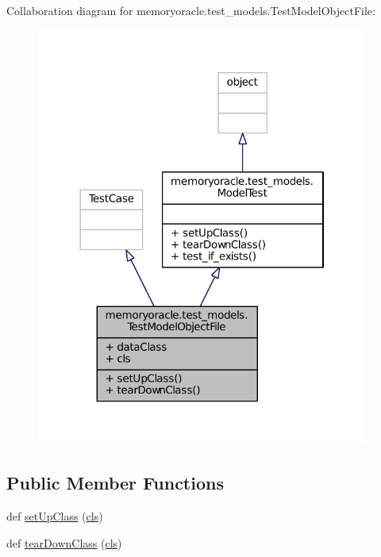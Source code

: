 Collaboration diagram for memoryoracle.\+test\+\_\+models.\+Test\+Model\+Object\+File\+:\nopagebreak
\begin{figure}[H]
\begin{center}
\leavevmode
\includegraphics[width=310pt]{classmemoryoracle_1_1test__models_1_1TestModelObjectFile__coll__graph}
\end{center}
\end{figure}
\subsection*{Public Member Functions}
\begin{DoxyCompactItemize}
\item 
def \hyperlink{classmemoryoracle_1_1test__models_1_1TestModelObjectFile_a37a8e9d32206002df10906d2359b54cd}{set\+Up\+Class} (\hyperlink{classmemoryoracle_1_1test__models_1_1TestModelObjectFile_a9888155b60bbe2869dca3ab86ab61137}{cls})
\item 
def \hyperlink{classmemoryoracle_1_1test__models_1_1TestModelObjectFile_a0ff03dbeb71b4c1de950164cf41abd15}{tear\+Down\+Class} (\hyperlink{classmemoryoracle_1_1test__models_1_1TestModelObjectFile_a9888155b60bbe2869dca3ab86ab61137}{cls})
\end{DoxyCompactItemize}
